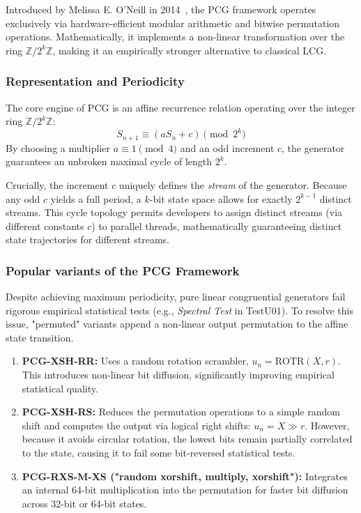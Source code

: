 Introduced by Melissa E. O'Neill in 2014~\cite{oneill2014pcg}, the PCG framework operates exclusively via hardware-efficient modular arithmetic and bitwise permutation operations. Mathematically, it implements a non-linear transformation over the ring $\mathbb{Z}/2^k\mathbb{Z}$, making it an empirically stronger alternative to classical LCG.


\subsubsection{Representation and Periodicity}

The core engine of PCG is an affine recurrence relation operating over the integer ring $\mathbb{Z}/2^k\mathbb{Z}$:
$$
S_{n+1} \equiv (a S_n + c) \pmod{2^k}
$$
By choosing a multiplier $a \equiv 1 \pmod 4$ and an odd increment $c$, the generator guarantees an unbroken maximal cycle of length $2^k$.

Crucially, the increment $c$ uniquely defines the \textit{stream} of the generator. Because any odd $c$ yields a full period, a $k$-bit state space allows for exactly $2^{k-1}$ distinct streams. This cycle topology permits developers to assign distinct streams (via different constants $c$) to parallel threads, mathematically guaranteeing distinct state trajectories for different streams.


\subsubsection{Popular variants of the PCG Framework}

Despite achieving maximum periodicity, pure linear congruential generators fail rigorous empirical statistical tests (e.g., \textit{Spectral Test} in TestU01). To resolve this issue, "permuted" variants append a non-linear output permutation to the affine state transition.

\begin{enumerate}
    \item \textbf{PCG-XSH-RR:} Uses a random rotation scrambler, $u_n = \text{ROTR}(X, r)$. This introduces non-linear bit diffusion, significantly improving empirical statistical quality.

    \item \textbf{PCG-XSH-RS:} Reduces the permutation operations to a simple random shift and computes the output via logical right shifts: $u_n = X \gg r$. However, because it avoids circular rotation, the lowest bits remain partially correlated to the state, causing it to fail some bit-reversed statistical tests.

    \item \textbf{PCG-RXS-M-XS ("random xorshift, multiply, xorshift"):} Integrates an internal 64-bit multiplication into the permutation for faster bit diffusion across 32-bit or 64-bit states. 
\end{enumerate}


